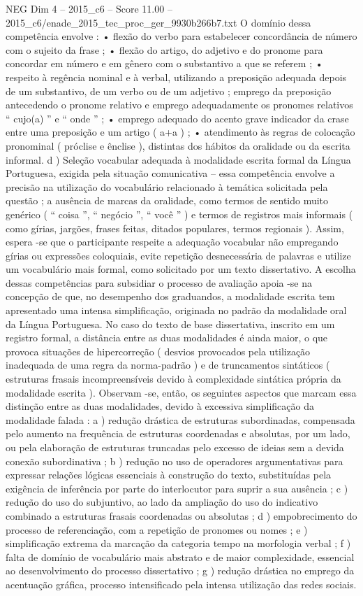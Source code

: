 \begin{textsample}{NEG Dim 4 – 2015\_c6 – Score 11.00 – 2015\_c6/enade\_2015\_tec\_proc\_ger\_9930b266b7.txt}
O domínio dessa competência envolve : • flexão do verbo para estabelecer concordância de número com o sujeito da frase ; • flexão do artigo, do adjetivo e do pronome para concordar em número e em gênero com o substantivo a que se referem ; • respeito à regência nominal e à verbal, utilizando a preposição adequada depois de um substantivo, de um verbo ou de um adjetivo ; emprego da preposição antecedendo o pronome relativo e emprego adequadamente os pronomes relativos “ cujo(a) ” e “ onde ” ; • emprego adequado do acento grave indicador da crase entre uma preposição e um artigo ( a+a ) ; • atendimento às regras de colocação pronominal ( próclise e ênclise ), distintas dos hábitos da oralidade ou da escrita informal. d ) Seleção vocabular adequada à modalidade escrita formal da Língua Portuguesa, exigida pela situação comunicativa – essa competência envolve a precisão na utilização do vocabulário relacionado à temática solicitada pela questão ; a ausência de marcas da oralidade, como termos de sentido muito genérico ( “ coisa ”, “ negócio ”, “ você ” ) e termos de registros mais informais ( como gírias, jargões, frases feitas, ditados populares, termos regionais ).
Assim, espera -se que o participante respeite a adequação vocabular não empregando gírias ou expressões coloquiais, evite repetição desnecessária de palavras e utilize um vocabulário mais formal, como solicitado por um texto dissertativo.
A escolha dessas competências para subsidiar o processo de avaliação apoia -se na concepção de que, no desempenho dos graduandos, a modalidade escrita tem apresentado uma intensa simplificação, originada no padrão da modalidade oral da Língua Portuguesa.
No caso do texto de base dissertativa, inscrito em um registro formal, a distância entre as duas modalidades é ainda maior, o que provoca situações de hipercorreção ( desvios provocados pela utilização inadequada de uma regra da norma-padrão ) e de truncamentos sintáticos ( estruturas frasais incompreensíveis devido à complexidade sintática própria da modalidade escrita ).
Observam -se, então, os seguintes aspectos que marcam essa distinção entre as duas modalidades, devido à excessiva simplificação da modalidade falada : a ) redução drástica de estruturas subordinadas, compensada pelo aumento na frequência de estruturas coordenadas e absolutas, por um lado, ou pela elaboração de estruturas truncadas pelo excesso de ideias sem a devida conexão subordinativa ; b ) redução no uso de operadores argumentativas para expressar relações lógicas essenciais à construção do texto, substituídas pela exigência de inferência por parte do interlocutor para suprir a sua ausência ; c ) redução do uso do subjuntivo, ao lado da ampliação do uso do indicativo combinado a estruturas frasais coordenadas ou absolutas ; d ) empobrecimento do processo de referenciação, com a repetição de pronomes ou nomes ; e ) simplificação extrema da marcação da categoria tempo na morfologia verbal ; f ) falta de domínio de vocabulário mais abstrato e de maior complexidade, essencial ao desenvolvimento do processo dissertativo ; g ) redução drástica no emprego da acentuação gráfica, processo intensificado pela intensa utilização das redes sociais.

\end{textsample}
